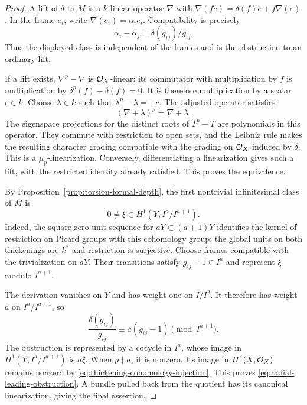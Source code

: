 \begin{proof}
A lift of $\delta$ to $M$ is a $k$-linear operator $\nabla$ with
$\nabla(fe)=\delta(f)e+f\nabla(e)$.
In the frame $e_i$, write $\nabla(e_i)=\alpha_i e_i$.
Compatibility is precisely
\[
 \alpha_i-\alpha_j=\delta(g_{ij})/g_{ij}.
\]
Thus the displayed class is independent of the frames and is the
obstruction to an ordinary lift.

If a lift exists, $\nabla^p-\nabla$ is $\mathcal O_X$-linear:
its commutator with multiplication by $f$ is multiplication by
$\delta^p(f)-\delta(f)=0$.
It is therefore multiplication by a scalar $c\in k$.
Choose $\lambda\in k$ such that $\lambda^p-\lambda=-c$.
The adjusted operator satisfies
\[
 (\nabla+\lambda)^p=\nabla+\lambda.
\]
The eigenspace projections for the distinct roots of $T^p-T$
are polynomials in this operator. They commute with restriction
to open sets, and the Leibniz rule makes the resulting character
grading compatible with the grading on $\mathcal O_X$ induced by
$\delta$. This is a $\mu_p$-linearization.
Conversely, differentiating a linearization gives such a lift,
with the restricted identity already satisfied.
This proves the equivalence.

By Proposition~\ref{prop:torsion-formal-depth}, the first
nontrivial infinitesimal class of $M$ is
\[
 0\ne\xi\in H^1(Y,I^a/I^{a+1}).
\]
Indeed, the square-zero unit sequence for
$aY\subset(a+1)Y$ identifies the kernel of restriction on Picard
groups with this cohomology group: the global units on both
thickenings are $k^*$ and restriction is surjective.
Choose frames compatible with the trivialization on $aY$.
Their transitions satisfy $g_{ij}-1\in I^a$ and represent $\xi$
modulo $I^{a+1}$.

The derivation vanishes on $Y$ and has weight one on $I/I^2$.
It therefore has weight $a$ on $I^a/I^{a+1}$, so
\[
 \frac{\delta(g_{ij})}{g_{ij}}
 \equiv a(g_{ij}-1)\pmod{I^{a+1}}.
\]
The obstruction is represented by a cocycle in $I^a$, whose image
in $H^1(Y,I^a/I^{a+1})$ is $a\xi$.
When $p\nmid a$, it is nonzero. Its image in $H^1(X,\mathcal O_X)$
remains nonzero by
\eqref{eq:thickening-cohomology-injection}.
This proves \eqref{eq:radial-leading-obstruction}.
A bundle pulled back from the quotient has its canonical
linearization, giving the final assertion.
\end{proof}



